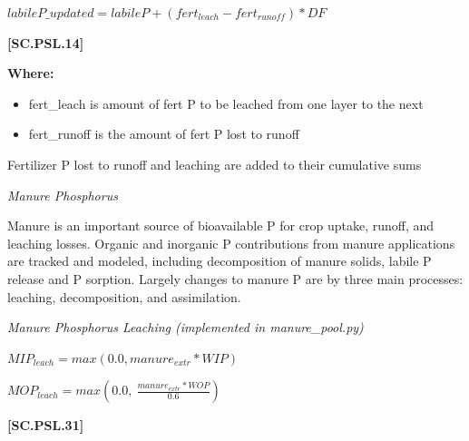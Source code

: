     \begin{center}
\(labileP\_updated=labileP+(fert_{leach}-fert_{runoff}) * DF\)

    \end{center}
        \vspace{0.5cm} 
    
            {\raggedleft \textbf{[SC.PSL.14]}\par}
            \vspace{0.5cm}

        \textbf{Where:}
            
        \begin{itemize}
            \item fert\_{leach} is amount of fert P to be leached from one layer to the next
            \item fert\_{runoff} is the amount of fert P lost to runoff
        \end{itemize}
        \vspace{0.5cm}
        
Fertilizer P lost to runoff and leaching are added to their cumulative sums

 \vspace{0.5cm}

\textit{Manure Phosphorus}
\vspace{0.2cm}

Manure is an important source of bioavailable P for crop uptake, runoff, and leaching losses. Organic and inorganic P contributions from manure applications are tracked and modeled, including decomposition of manure solids, labile P release and P sorption. Largely changes to manure P are by three main processes: leaching, decomposition, and assimilation.  



\textit{Manure Phosphorus Leaching (implemented in manure\_pool.py)}
\vspace{0.2cm}
        
    \begin{center}
\(MIP_{leach} = max(0.0, manure_{extr}*WIP) \)
\vspace{0.1cm}

\(MOP_{leach} = max(0.0,\ \frac{manure_{extr}*WOP}{0.6})\)

    \end{center}
        \vspace{0.5cm} 
    
            {\raggedleft \textbf{[SC.PSL.31]}\par}
            \vspace{0.5cm}

